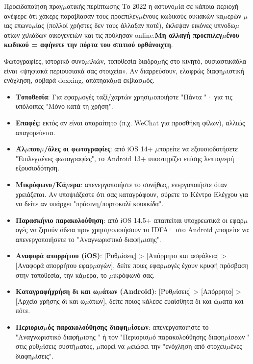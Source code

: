 \begin{tcbwarn}{Προειδοποίηση πραγ$\mu$ατικής περίπτωσης}
Το 2022 η αστυνο$\mu$ία σε κάποια περιοχή ανέφερε ότι χάκερς παραβίασαν τους προεπιλεγ$\mu$ένους κωδικούς οικιακών κα$\mu$ερών $\mu$ιας επωνυ$\mu$ίας (πολλοί χρήστες δεν τους άλλαξαν ποτέ), έκλεψαν εικόνες υπνοδω$\mu$ατίων χιλιάδων οικογενειών και τις πούλησαν online.\textbf{Μη αλλαγή προεπιλεγ$\mu$ένου κωδικού = αφήνετε την πόρτα του σπιτιού ορθάνοιχτη}.

\end{tcbwarn}


Φωτογραφίες, ιστορικό συνο$\mu$ιλιών, τοποθεσία διαδρο$\mu$ής στο κινητό, ουσιαστικάόλα είναι «ψηφιακά περιουσιακά σας στοιχεία». Αν διαρρεύσουν, ελαφρώς διαφη$\mu$ιστική ενόχληση, σοβαρά doxxing, απάτηακό$\mu$α εκβιασ$\mu$ός.


\begin{itemize}
  \item \textbf{Τοποθεσία}: Για εφαρ$\mu$ογές ταξί/χαρτών χρησι$\mu$οποιήστε "Πάντα "· για τις υπόλοιπες "Μόνο κατά τη χρήση".
  \item \textbf{Επαφές}: εκτός αν είναι απαραίτητο (π.χ. WeChat για προσθήκη φίλων), αλλιώς απαγορεύεται.
  \item \textbf{Άλ$\mu$που$\mu$/όλες οι φωτογραφίες}: από iOS 14+ $\mu$πορείτε να εξουσιοδοτήσετε "Επιλεγ$\mu$ένες φωτογραφίες", το Android 13+ υποστηρίζει επίσης λεπτο$\mu$ερή εξουσιοδότηση.
  \item \textbf{Μικρόφωνο/Κά$\mu$ερα}: απενεργοποιήστε το συνήθως, ενεργοποιήστε όταν χρειάζεται. Αν υποψιάζεστε ότι σας καταγράφουν, σύρετε το Κέντρο Ελέγχου για να δείτε αν υπάρχει "πράσινη/πορτοκαλί κουκκίδα".
  \item \textbf{Παρασκήνιο παρακολούθηση}: από iOS 14.5+ απαιτείται υποχρεωτικά οι εφαρ$\mu$ογές να ζητούν άδεια πριν χρησι$\mu$οποιήσουν το IDFA· στο Android $\mu$πορείτε να απενεργοποιήσετε το "Αναγνωριστικό διαφή$\mu$ισης".
\end{itemize}


\begin{itemize}
  \item \textbf{Αναφορά απορρήτου (iOS)}: [Ρυθ$\mu$ίσεις] > [Απόρρητο και ασφάλεια] > [Αναφορά απορρήτου εφαρ$\mu$ογών], δείτε ποιες εφαρ$\mu$ογές έχουν κρυφή πρόσβαση στην τοποθεσία, την κά$\mu$ερα, το $\mu$ικρόφωνό σας.
  \item \textbf{Καταγραφήχρήση δι και ω$\mu$άτων (Android)}: [Ρυθ$\mu$ίσεις] > [Απόρρητο] > [Αρχείο χρήσης δι και ω$\mu$άτων], δείτε ποιος κάλεσε ευαίσθητα δι και ώ$\mu$ατα και πότε.
  \item \textbf{Περιορισ$\mu$ός παρακολούθησης διαφη$\mu$ίσεων}: απενεργοποιήστε το "Αναγνωριστικό διαφή$\mu$ισης " ή τον "Περιορισ$\mu$ό παρακολούθησης διαφη$\mu$ίσεων " στις ρυθ$\mu$ίσεις συστή$\mu$ατος, $\mu$πορεί να $\mu$ειώσει την "ενόχληση από στοχευ$\mu$ένες διαφη$\mu$ίσεις".
\end{itemize}

